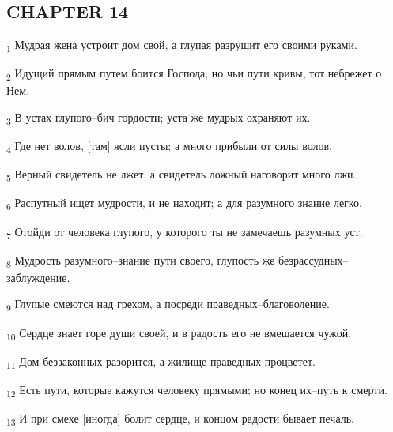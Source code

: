 \subsection{CHAPTER 14}
\begin{tcolorbox}
\textsubscript{1} Мудрая жена устроит дом свой, а глупая разрушит его своими руками.
\end{tcolorbox}
\begin{tcolorbox}
\textsubscript{2} Идущий прямым путем боится Господа; но чьи пути кривы, тот небрежет о Нем.
\end{tcolorbox}
\begin{tcolorbox}
\textsubscript{3} В устах глупого--бич гордости; уста же мудрых охраняют их.
\end{tcolorbox}
\begin{tcolorbox}
\textsubscript{4} Где нет волов, [там] ясли пусты; а много прибыли от силы волов.
\end{tcolorbox}
\begin{tcolorbox}
\textsubscript{5} Верный свидетель не лжет, а свидетель ложный наговорит много лжи.
\end{tcolorbox}
\begin{tcolorbox}
\textsubscript{6} Распутный ищет мудрости, и не находит; а для разумного знание легко.
\end{tcolorbox}
\begin{tcolorbox}
\textsubscript{7} Отойди от человека глупого, у которого ты не замечаешь разумных уст.
\end{tcolorbox}
\begin{tcolorbox}
\textsubscript{8} Мудрость разумного--знание пути своего, глупость же безрассудных--заблуждение.
\end{tcolorbox}
\begin{tcolorbox}
\textsubscript{9} Глупые смеются над грехом, а посреди праведных--благоволение.
\end{tcolorbox}
\begin{tcolorbox}
\textsubscript{10} Сердце знает горе души своей, и в радость его не вмешается чужой.
\end{tcolorbox}
\begin{tcolorbox}
\textsubscript{11} Дом беззаконных разорится, а жилище праведных процветет.
\end{tcolorbox}
\begin{tcolorbox}
\textsubscript{12} Есть пути, которые кажутся человеку прямыми; но конец их--путь к смерти.
\end{tcolorbox}
\begin{tcolorbox}
\textsubscript{13} И при смехе [иногда] болит сердце, и концом радости бывает печаль.
\end{tcolorbox}

